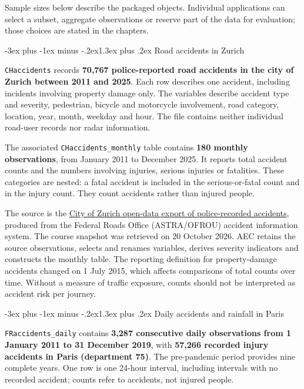 \documentclass[
  11pt,
]{book}
\makeatletter
\renewcommand\section{\@startsection{section}{1}{\z@}
  {-3ex plus -1ex minus -.2ex}{1.3ex plus .2ex}
  {\normalfont\Large\bfseries\color{TextbookInk}}}
\theoremstyle{definition}
\theoremstyle{definition}
\theoremstyle{definition}
\theoremstyle{definition}
\theoremstyle{remark}
\makeatother
\begin{document}
Sample sizes below describe the packaged objects. Individual applications can select a subset, aggregate observations or reserve part of the data for evaluation; those choices are stated in the chapters.

\section{Road accidents in Zurich}\label{data-accidents}

\texttt{CHaccidents} records \textbf{70,767 police-reported road accidents in the city of Zurich between 2011 and 2025}. Each row describes one accident, including incidents involving property damage only. The variables describe accident type and severity, pedestrian, bicycle and motorcycle involvement, road category, location, year, month, weekday and hour. The file contains neither individual road-user records nor radar information.

The associated \texttt{CHaccidents\_monthly} table contains \textbf{180 monthly observations}, from January 2011 to December 2025. It reports total accident counts and the numbers involving injuries, serious injuries or fatalities. These categories are nested: a fatal accident is included in the serious-or-fatal count and in the injury count. They count accidents rather than injured people.

The source is the \href{https://data.stadt-zuerich.ch/dataset/sid_dav_strassenverkehrsunfallorte}{City of Zurich open-data export of police-recorded accidents}, produced from the Federal Roads Office (ASTRA/OFROU) accident information system. The course snapshot was retrieved on 20 October 2026. AEC retains the source observations, selects and renames variables, derives severity indicators and constructs the monthly table. The reporting definition for property-damage accidents changed on 1 July 2015, which affects comparisons of total counts over time. Without a measure of traffic exposure, counts should not be interpreted as accident risk per journey.

\section{Daily accidents and rainfall in Paris}\label{data-paris-weather}

\texttt{FRaccidents\_daily} contains \textbf{3,287 consecutive daily observations from 1 January 2011 to 31 December 2019}, with \textbf{57,266 recorded injury accidents in Paris (department 75)}. The pre-pandemic period provides nine complete years. One row is one 24-hour interval, including intervals with no recorded accident; counts refer to accidents, not injured people.
\end{document}

